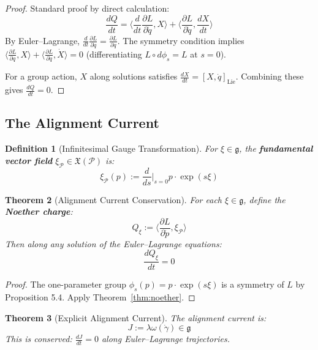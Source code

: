\documentclass[11pt]{article}
\newtheorem{theorem}{Theorem}[section]
\newtheorem{definition}[theorem]{Definition}
\begin{document}
\begin{proof}
Standard proof by direct calculation:
\[
\frac{dQ}{dt} = \langle \frac{d}{dt}\frac{\partial L}{\partial \dot{q}}, X \rangle + \langle \frac{\partial L}{\partial \dot{q}}, \frac{dX}{dt} \rangle
\]
By Euler--Lagrange, $\frac{d}{dt}\frac{\partial L}{\partial \dot{q}} = \frac{\partial L}{\partial q}$. The symmetry condition implies $\langle \frac{\partial L}{\partial q}, X \rangle + \langle \frac{\partial L}{\partial \dot{q}}, \dot{X} \rangle = 0$
(differentiating $L \circ d\phi_s = L$ at $s = 0$).

For a group action, $X$ along solutions satisfies $\frac{dX}{dt} = [X, \dot{q}]_{\mathrm{Lie}}$. Combining these gives
$\frac{dQ}{dt} = 0$.
\end{proof}

\subsection{The Alignment Current}

\begin{definition}[Infinitesimal Gauge Transformation]
For $\xi \in \mathfrak{g}$, the \textbf{fundamental vector
field} $\xi_{\mathcal{P}} \in \mathfrak{X}(\mathcal{P})$ is:
\[
\xi_{\mathcal{P}}(p) := \frac{d}{ds}\bigg|_{s=0} p \cdot \exp(s\xi)
\]
\end{definition}

\begin{theorem}[Alignment Current Conservation]
\label{thm:alignment}
For each $\xi \in \mathfrak{g}$, define the \textbf{Noether charge}:
\[
Q_\xi := \langle \frac{\partial L}{\partial \dot{p}}, \xi_{\mathcal{P}} \rangle
\]
Then along any solution of the Euler--Lagrange equations:
\[
\frac{dQ_\xi}{dt} = 0
\]
\end{theorem}

\begin{proof}
The one-parameter group $\phi_s(p) = p \cdot \exp(s\xi)$ is a symmetry of $L$ by Proposition 5.4.
Apply Theorem~\ref{thm:noether}.
\end{proof}

\begin{theorem}[Explicit Alignment Current]
The alignment current is:
\begin{equation}
J := \lambda\omega(\dot{\gamma}) \in \mathfrak{g}
\label{eq:current}
\end{equation}
This is conserved: $\frac{dJ}{dt} = 0$ along Euler--Lagrange trajectories.
\end{theorem}
\end{document}

